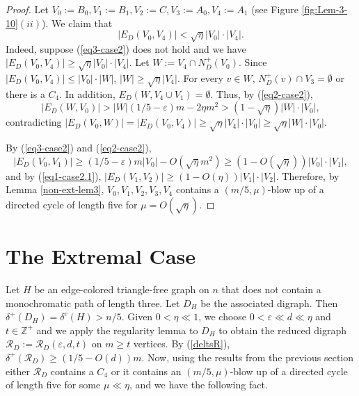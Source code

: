 \documentclass{article}
\renewcommand{\epsilon}{{\varepsilon}}
\begin{document}
 \begin{proof}
 Let $V_0:=B_0, V_1:=B_1, V_2:=C, V_3:=A_0, V_4:=A_1$  (see Figure \ref{fig:Lem-3-10}$(ii)$). 
We claim that
 \begin{equation}\label{eq3-case2}
 |E_D(V_0, V_4)|<\sqrt{\eta}|V_0|\cdot |V_4|.
 \end{equation}
 Indeed, suppose (\ref{eq3-case2}) does not hold and we have $ |E_D(V_0, V_4)|\geq \sqrt{\eta}|V_0|\cdot |V_4|.$ Let $W:= V_4\cap N^+_D(V_0).$ Since $|E_D(V_0,V_4)|\leq |V_0|\cdot |W|$,  $|W|\geq \sqrt{\eta}|V_4|$. For every $v\in W$, $N^+_D(v)\cap V_3=\emptyset$ or there is a $C_4$. In addition, $E_D(W, V_4\cup V_1)=\emptyset$. Thus, by (\ref{eq2-case2}), 
 $$|E_D(W, V_0)|> |W|(1/5-\epsilon)m- 2\eta m^2>(1-\sqrt{\eta})|W|\cdot |V_0|,$$
 contradicting $|E_D(V_0, W)|=|E_D(V_0, V_4)|\geq \sqrt{\eta}|V_4|\cdot |V_0|\geq \sqrt{\eta}|W|\cdot |V_0|.$ 

 By (\ref{eq3-case2}) and (\ref{eq2-case2}),
 \begin{equation}
 |E_D(V_0, V_1)|\geq (1/5-\epsilon)m|V_0|- O(\sqrt{\eta}m^2)\geq (1-O(\sqrt{\eta}))|V_0|\cdot |V_1|,
 \end{equation}
 and by (\ref{eq1-case2.1}), $|E_D(V_1, V_2)|\geq (1-O(\eta))|V_1|\cdot |V_2|.$ Therefore, by Lemma \ref{non-ext-lem3}, $V_0, V_1, V_2, V_3, V_4$ contains a $(m/5, \mu)$-blow up of a directed cycle of length five for $\mu=O(\sqrt{\eta})$.
 \end{proof}
 \section{The Extremal Case}\label{ext-section}
Let $H$ be an edge-colored triangle-free graph on  $n$ that does not contain a monochromatic path of length three. Let $D_H$ be the associated digraph. Then $\delta^+(D_H)= \delta^c(H)>n/5$. Given $0<\eta \ll 1$, we choose $0<\epsilon\ll d \ll \eta$ and $t\in \mathbb{Z}^+$ and we apply the regularity lemma to $D_H$ to obtain the reduced digraph $\mathcal{R}_D:=\mathcal{R}_D(\epsilon, d, t)$ on $m\geq t$ vertices. By (\ref{deltsR}),  $\delta^+(\mathcal{R}_D)\geq (1/5-O(d))m$. Now, using the results from the previous section either $\mathcal{R}_D$ contains a $C_4$ or it contains an $(m/5, \mu)$-blow up of a directed cycle of length five for some $\mu \ll \eta$, and we have the following fact.  
\end{document}
